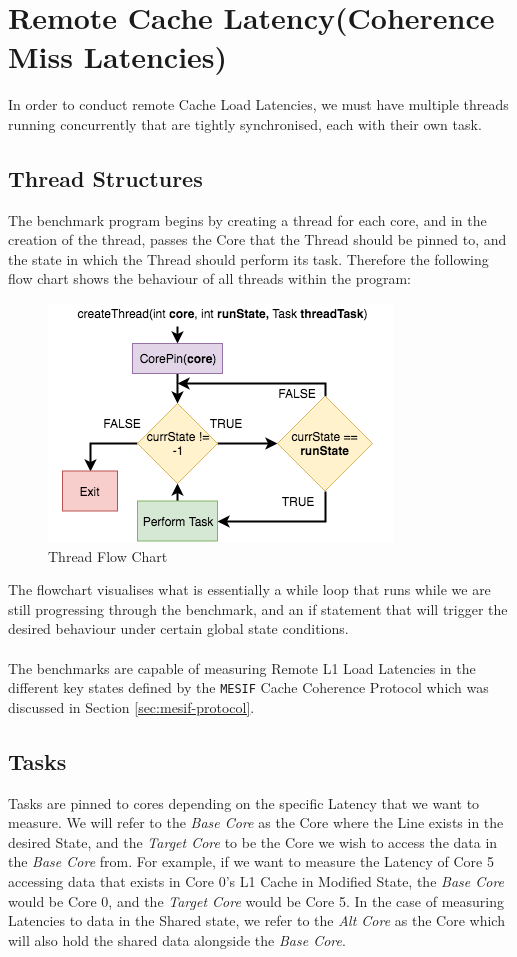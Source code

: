 \documentclass[bsc,frontabs,twoside,singlespacing,parskip,deptreport]{infthesis}     %
\begin{document}
\newpage

\section{Remote Cache Latency(Coherence Miss Latencies)}\label{mcdram-dram-benchmarks}
In order to conduct remote Cache Load Latencies, we must have multiple threads running concurrently that are tightly synchronised, each with their own task.

\subsection{Thread Structures}
 The benchmark program begins by creating a thread for each core, and in the creation of the thread, passes the Core that the Thread should be pinned to, and the state in which the Thread should perform its task. Therefore the following flow chart shows the behaviour of all threads within the program:

\begin{figure}[!h]
    \centering
    \includegraphics{Thread_Structure.png}
    \caption{Thread Flow Chart}
    \label{fig:thread-flowchart}
\end{figure}

The flowchart visualises what is essentially a while loop that runs while we are still progressing through the benchmark, and an if statement that will trigger the desired behaviour under certain global state conditions. \\
\\
The benchmarks are capable of measuring Remote L1 Load Latencies in the different key states defined by the \texttt{MESIF} Cache Coherence Protocol which was discussed in Section \ref{sec:mesif-protocol}.

\subsection{Tasks}
Tasks are pinned to cores depending on the specific Latency that we want to measure. We will refer to the \emph{Base Core} as the Core where the Line exists in the desired State, and the \emph{Target Core} to be the Core we wish to access the data in the \emph{Base Core} from. For example, if we want to measure the Latency of Core 5 accessing data that exists in Core 0's L1 Cache in Modified State, the \emph{Base Core} would be Core 0, and the \emph{Target Core} would be Core 5. In the case of measuring Latencies to data in the Shared state, we refer to the \emph{Alt Core} as the Core which will also hold the shared data alongside the \emph{Base Core}.
\end{document}
